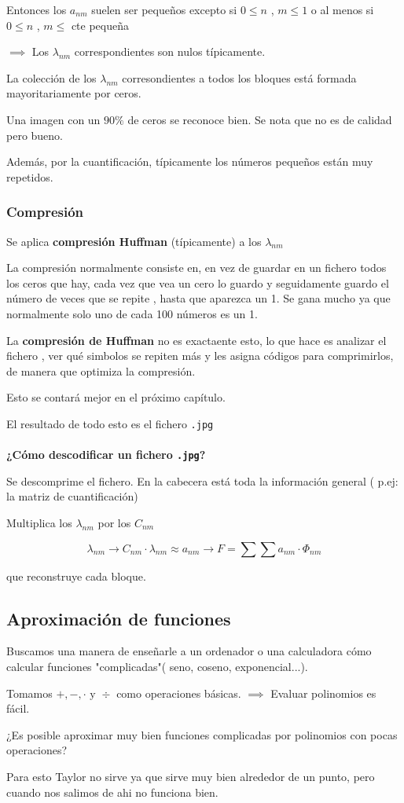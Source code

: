 Entonces los $a_{nm}$ suelen ser pequeños excepto si $0 \leq n$ , $m \leq 1$ o al menos si $0 \leq n$ , $m \leq$ cte pequeña

$\implies$ Los $\lambda_{nm}$ correspondientes son nulos típicamente.

La colección de los $\lambda_{nm}$ corresondientes a todos los bloques está formada mayoritariamente por ceros.

\begin{example}
	Una imagen con un  $90\%$ de ceros se reconoce bien. Se nota que no es de calidad pero bueno.
\end{example}

Además, por la cuantificación, típicamente los números pequeños están muy repetidos.

\subsubsection{Compresión}
Se aplica \textbf{compresión Huffman} (típicamente) a los $\lambda_{nm}$

La compresión normalmente consiste en, en vez de guardar en un fichero todos los ceros que hay, cada vez que vea un cero lo guardo y seguidamente guardo el número de veces que se repite , hasta que aparezca un 1. Se gana mucho ya que normalmente solo uno de cada 100 números es un 1.

La \textbf{compresión de Huffman} no es exactaente esto, lo que hace es analizar el fichero , ver qué simbolos se repiten más y les asigna códigos para comprimirlos, de manera que optimiza la compresión.

Esto se contará mejor en el próximo capítulo.


El resultado de todo esto es el fichero \texttt{.jpg}\\\\




	\textbf{¿Cómo descodificar un  fichero \texttt{.jpg}?}
	
	Se descomprime el fichero. En la cabecera está toda la información general ( p.ej: la matriz de cuantificación)
	
	Multiplica los $\lambda_{nm}$ por los $C_{nm}$
	
	$$\lambda_{nm} \rightarrow C_{nm}\cdot \lambda_{nm} \approx a_{nm} \rightarrow F = \sum \sum a_{nm} \cdot \Phi_{nm}$$
	
	que reconstruye cada bloque.
	
\subsection{Aproximación de funciones}

Buscamos una manera de enseñarle a un ordenador o una calculadora cómo calcular funciones "complicadas"( seno, coseno, exponencial...).


Tomamos $ +,-, \cdot \text{ y } \div$ como operaciones básicas. $\implies$ Evaluar polinomios es fácil.

¿Es posible aproximar muy bien funciones complicadas por polinomios con pocas operaciones?


Para esto Taylor no sirve ya que sirve muy bien alrededor de un punto, pero cuando nos salimos de ahi no funciona bien. 